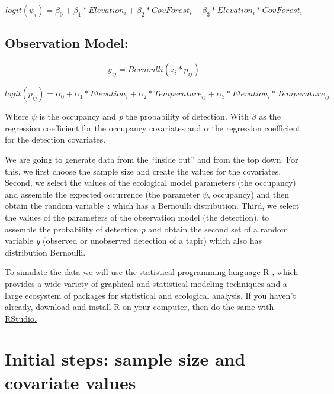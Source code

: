 \documentclass[
]{book}
\begin{document}
\begin{equation} 
logit(\psi _{i}) = \beta _{0} + \beta _{1} \ast Elevation _{i} + \beta _{2}\ast CovForest _{i} + \beta _{3} \ast Elevation _{i} \ast CovForest _{i}
  \label{eq:binom}
\end{equation}

\hypertarget{observation-model}{%
\subsection{Observation Model:}\label{observation-model}}

\begin{equation} 
y _{ij} = Bernoulli (z _{i} * p _{ij})
  \label{eq:binom}
\end{equation}

\begin{equation} 
logit(p _{ij}) = \alpha  _{0} + \alpha  _{1} \ast Elevation _{i} + \alpha  _{2}\ast Temperature _{ij} + \alpha _{3} \ast Elevation _{i} \ast Temperature _{ij}
  \label{eq:binom}
\end{equation}

Where \(\psi\) is the occupancy and \emph{p} the probability of detection. With \(\beta\) as the regression coefficient for the occupancy covariates and \(\alpha\) the regression coefficient for the detection covariates.

We are going to generate data from the ``inside out'' and from the top down. For this, we first choose the sample size and create the values for the covariates. Second, we select the values of the ecological model parameters (the occupancy) and assemble the expected occurrence (the parameter \(\psi\), occupancy) and then obtain the random variable \emph{z} which has a Bernoulli distribution. Third, we select the values of the parameters of the observation model (the detection), to assemble the probability of detection \emph{p} and obtain the second set of a random variable \emph{y} (observed or unobserved detection of a tapir) which also has distribution Bernoulli.

To simulate the data we will use the statistical programming language R \citep{RCoreTeam2016}, which provides a wide variety of graphical and statistical modeling techniques and a large ecosystem of packages for statistical and ecological analysis. If you haven't already, download and install \href{http://www.r-project.org/}{R} on your computer, then do the same with \href{http://www.rstudio.com\%20/}{RStudio.}

\hypertarget{initial-steps-sample-size-and-covariate-values}{%
\section{Initial steps: sample size and covariate values}\label{initial-steps-sample-size-and-covariate-values}}
\end{document}
